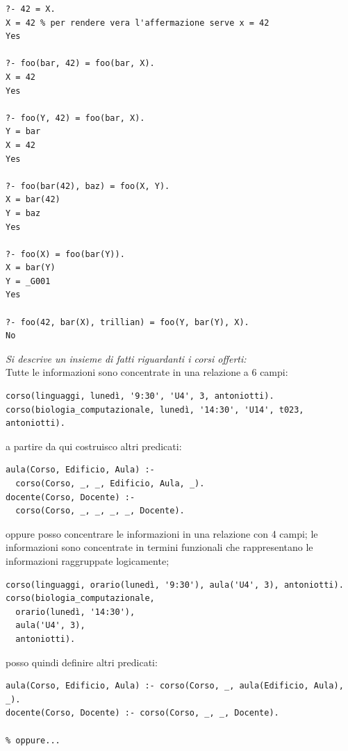 \documentclass[a4paper,12pt, oneside]{book}
\begin{document}
\begin{itemize}
\begin{verbatim}
?- 42 = X.
X = 42 % per rendere vera l'affermazione serve x = 42
Yes

?- foo(bar, 42) = foo(bar, X).
X = 42
Yes

?- foo(Y, 42) = foo(bar, X).
Y = bar
X = 42
Yes

?- foo(bar(42), baz) = foo(X, Y).
X = bar(42)
Y = baz
Yes

?- foo(X) = foo(bar(Y)).
X = bar(Y)
Y = _G001
Yes

?- foo(42, bar(X), trillian) = foo(Y, bar(Y), X).
No
\end{verbatim}
	      \begin{esempio}
		      \textit{Si descrive un insieme di fatti riguardanti i corsi offerti:}\\
		      Tutte le informazioni sono concentrate in una relazione a 6 campi:
		      \begin{verbatim}
corso(linguaggi, lunedì, '9:30', 'U4', 3, antoniotti).
corso(biologia_computazionale, lunedì, '14:30', 'U14', t023, antoniotti).
\end{verbatim}
		      a partire da qui costruisco altri predicati:
		      \begin{verbatim}
aula(Corso, Edificio, Aula) :-
  corso(Corso, _, _, Edificio, Aula, _).
docente(Corso, Docente) :-
  corso(Corso, _, _, _, _, Docente).
\end{verbatim}
		      oppure posso concentrare le informazioni in una relazione con 4 campi; le informazioni sono concentrate in termini funzionali che rappresentano le informazioni raggruppate logicamente;
		      \begin{verbatim}
corso(linguaggi, orario(lunedì, '9:30'), aula('U4', 3), antoniotti).
corso(biologia_computazionale,
  orario(lunedì, '14:30'),
  aula('U4', 3),
  antoniotti).
\end{verbatim}
		      posso quindi definire altri predicati:
		      \begin{verbatim}
aula(Corso, Edificio, Aula) :- corso(Corso, _, aula(Edificio, Aula), _).
docente(Corso, Docente) :- corso(Corso, _, _, Docente).

% oppure...


\end{verbatim}
\end{esempio}
\end{itemize}
\end{document}
